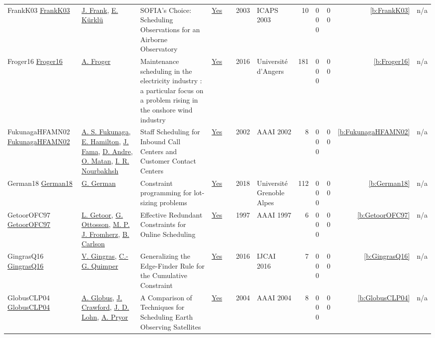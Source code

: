 {\begin{longtable}{>{\raggedright\arraybackslash}p{3cm}>{\raggedright\arraybackslash}p{4.5cm}>{\raggedright\arraybackslash}p{6.0cm}rrrp{2.5cm}rp{1cm}p{1cm}rr}
FrankK03 \href{http://www.aaai.org/Library/ICAPS/2003/icaps03-023.php}{FrankK03} & \hyperref[auth:a379]{J. Frank}, \hyperref[auth:a380]{E. K{\"{u}}rkl{\"{u}}} & SOFIA's Choice: Scheduling Observations for an Airborne Observatory & \href{../works/FrankK03.pdf}{Yes} & \cite{FrankK03} & 2003 & ICAPS 2003 & 10 & 0 0 0 & 0 0 & \ref{b:FrankK03} & n/a\\
Froger16 \href{https://theses.hal.science/tel-01440836}{Froger16} & \hyperref[auth:a888]{A. Froger} & {Maintenance scheduling in the electricity industry : a particular focus on a problem rising in the onshore wind industry} & \href{../works/Froger16.pdf}{Yes} & \cite{Froger16} & 2016 & {Universit{\'e} d'Angers} & 181 & 0 0 0 & 0 0 & \ref{b:Froger16} & n/a\\
FukunagaHFAMN02 \href{http://www.aaai.org/Library/AAAI/2002/aaai02-123.php}{FukunagaHFAMN02} & \hyperref[auth:a1328]{A. S. Fukunaga}, \hyperref[auth:a1329]{E. Hamilton}, \hyperref[auth:a1330]{J. Fama}, \hyperref[auth:a1331]{D. Andre}, \hyperref[auth:a1332]{O. Matan}, \hyperref[auth:a1333]{I. R. Nourbakhsh} & Staff Scheduling for Inbound Call Centers and Customer Contact Centers & \href{../works/FukunagaHFAMN02.pdf}{Yes} & \cite{FukunagaHFAMN02} & 2002 & AAAI 2002 & 8 & 0 0 0 & 0 0 & \ref{b:FukunagaHFAMN02} & n/a\\
German18 \href{https://theses.hal.science/tel-01896325}{German18} & \hyperref[auth:a890]{G. German} & {Constraint programming for lot-sizing problems} & \href{../works/German18.pdf}{Yes} & \cite{German18} & 2018 & {Universit{\'e} Grenoble Alpes} & 112 & 0 0 0 & 0 0 & \ref{b:German18} & n/a\\
GetoorOFC97 \href{http://www.aaai.org/Library/AAAI/1997/aaai97-047.php}{GetoorOFC97} & \hyperref[auth:a1293]{L. Getoor}, \hyperref[auth:a852]{G. Ottosson}, \hyperref[auth:a1294]{M. P. J. Fromherz}, \hyperref[auth:a1295]{B. Carlson} & Effective Redundant Constraints for Online Scheduling & \href{../works/GetoorOFC97.pdf}{Yes} & \cite{GetoorOFC97} & 1997 & AAAI 1997 & 6 & 0 0 0 & 0 0 & \ref{b:GetoorOFC97} & n/a\\
GingrasQ16 \href{http://www.ijcai.org/Abstract/16/440}{GingrasQ16} & \hyperref[auth:a313]{V. Gingras}, \hyperref[auth:a37]{C.-G. Quimper} & Generalizing the Edge-Finder Rule for the Cumulative Constraint & \href{../works/GingrasQ16.pdf}{Yes} & \cite{GingrasQ16} & 2016 & IJCAI 2016 & 7 & 0 0 0 & 0 0 & \ref{b:GingrasQ16} & n/a\\
GlobusCLP04 \href{}{GlobusCLP04} & \hyperref[auth:a1337]{A. Globus}, \hyperref[auth:a1338]{J. Crawford}, \hyperref[auth:a1339]{J. D. Lohn}, \hyperref[auth:a1340]{A. Pryor} & A Comparison of Techniques for Scheduling Earth Observing Satellites & \href{../works/GlobusCLP04.pdf}{Yes} & \cite{GlobusCLP04} & 2004 & AAAI 2004 & 8 & 0 0 0 & 0 0 & \ref{b:GlobusCLP04} & n/a\\

\end{longtable}}
